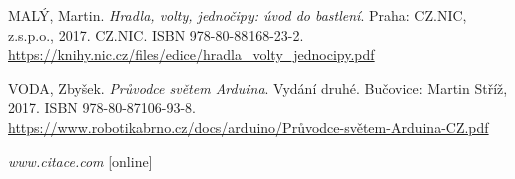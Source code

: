 \begin{thebibliography}{9} \label{literatura}
	
	 MALÝ, Martin. \textit{Hradla, volty, jednočipy: úvod do bastlení}. Praha: CZ.NIC, z.s.p.o., 2017. CZ.NIC. ISBN 978-80-88168-23-2. \\
	\url{https://knihy.nic.cz/files/edice/hradla_volty_jednocipy.pdf}
	
	 VODA, Zbyšek. \textit{Průvodce světem Arduina}. Vydání druhé. Bučovice: Martin Stříž, 2017. ISBN 978-80-87106-93-8. \\
	\url{https://www.robotikabrno.cz/docs/arduino/Průvodce-světem-Arduina-CZ.pdf}

	 \textit{www.citace.com}  [online]
	
\end{thebibliography} %




